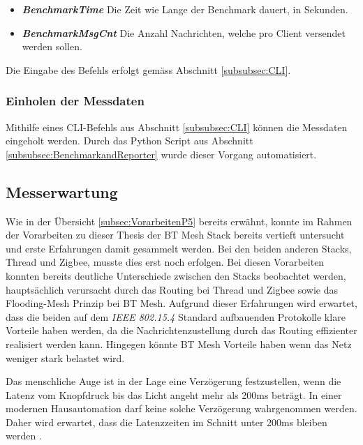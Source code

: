 \begin{itemize}
	\item \textit{\textbf{BenchmarkTime}} Die Zeit wie Lange der Benchmark dauert, in Sekunden. 
	\item \textit{\textbf{BenchmarkMsgCnt}} Die Anzahl Nachrichten, welche pro Client versendet werden sollen. 
\end{itemize}

Die Eingabe des Befehls erfolgt gemäss Abschnitt \ref{subsubsec:CLI}. 


\subsubsection{Einholen der Messdaten}\label{subsec:GetNodeReports}
Mithilfe eines CLI-Befehls aus Abschnitt \ref{subsubsec:CLI} können die Messdaten eingeholt werden. Durch das Python Script aus Abschnitt \ref{subsubsec:BenchmarkandReporter} wurde dieser Vorgang automatisiert. 


\subsection{Messerwartung}\label{subsec:Messerwartung}
Wie in der Übersicht \ref{subsec:VorarbeitenP5} bereits erwähnt, konnte im Rahmen der Vorarbeiten zu dieser Thesis der BT Mesh Stack bereits vertieft untersucht und erste Erfahrungen damit gesammelt werden. Bei den beiden anderen Stacks, Thread und Zigbee, musste dies erst noch erfolgen.
Bei diesen Vorarbeiten konnten bereits deutliche Unterschiede zwischen den Stacks beobachtet werden, hauptsächlich verursacht durch das Routing bei Thread und Zigbee sowie das Flooding-Mesh Prinzip bei BT Mesh.
Aufgrund dieser Erfahrungen wird erwartet, dass die beiden auf dem \textit{IEEE 802.15.4} Standard aufbauenden Protokolle klare Vorteile haben werden, da die Nachrichtenzustellung durch das Routing effizienter realisiert werden kann.
Hingegen könnte BT Mesh Vorteile haben wenn das Netz weniger stark belastet wird.

Das menschliche Auge ist in der Lage eine Verzögerung festzustellen, wenn die Latenz vom Knopfdruck bis das Licht angeht mehr als 200ms beträgt.
In einer modernen Hausautomation darf keine solche Verzögerung wahrgenommen werden. Daher wird erwartet, dass die Latenzzeiten im Schnitt unter 200ms bleiben werden \cite{silicon_laboratories_inc_an1142_2020}.



